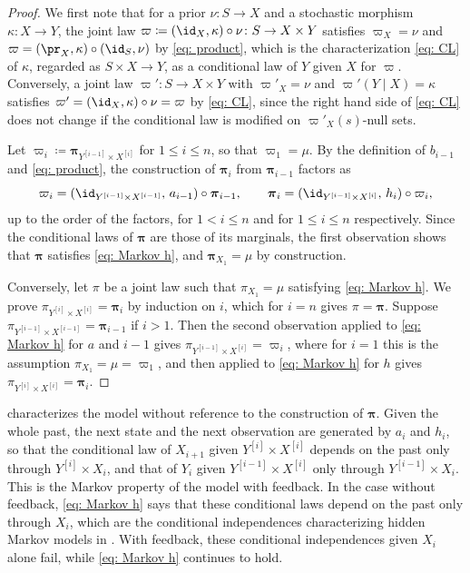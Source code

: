 \documentclass[12pt,reqno]{amsart}%
\theoremstyle{plain}
\theoremstyle{definition}
\def\bspi{\boldsymbol{\pi}}
\begin{document}
\begin{proof}
	We first note that for a prior $\nu\colon S\rightarrow X$ and a stochastic morphism $\kappa\colon X\rightarrow Y$,
	the joint law $\varpi\coloneqq(\id_X,\kappa)\circ\nu\colon S\rightarrow X\times Y$ satisfies $\varpi_X=\nu$ and
	$\varpi=(\pr_X,\kappa)\circ(\id_S,\nu)$ by \eqref{eq: product},
	which is the characterization \eqref{eq: CL} of $\kappa$, regarded as $S\times X\rightarrow Y$,
	as a conditional law of $Y$ given $X$ for $\varpi$.
	Conversely, a joint law $\varpi'\colon S\rightarrow X\times Y$ with $\varpi'_X=\nu$ and $\varpi'(Y\mid X)=\kappa$
	satisfies $\varpi'=(\id_X,\kappa)\circ\nu=\varpi$ by \eqref{eq: CL}, since the right hand side of \eqref{eq: CL}
	does not change if the conditional law is modified on $\varpi'_X(s)$-null sets.

	Let $\varpi_i\coloneqq\bspi_{Y^{[i-1]}\times X^{[i]}}$ for $1\leq i\leq n$, so that $\varpi_1=\mu$.
	By the definition of $b_{i-1}$ and \eqref{eq: product}, the construction of $\bspi_i$ from $\bspi_{i-1}$ factors as
	\[
		\varpi_i=(\id_{Y^{[i-1]}\times X^{[i-1]}},\,a_{i-1})\circ\bspi_{i-1},\qquad
		\bspi_i=(\id_{Y^{[i-1]}\times X^{[i]}},\,h_i)\circ\varpi_i,
	\]
	up to the order of the factors, for $1<i\leq n$ and for $1\leq i\leq n$ respectively.
	Since the conditional laws of $\bspi$ are those of its marginals, the first observation shows that
	$\bspi$ satisfies \eqref{eq: Markov h}, and $\bspi_{X_1}=\mu$ by construction.

	Conversely, let $\pi$ be a joint law such that $\pi_{X_1}=\mu$ satisfying \eqref{eq: Markov h}.
	We prove $\pi_{Y^{[i]}\times X^{[i]}}=\bspi_i$ by induction on $i$, which for $i=n$ gives $\pi=\bspi$.
	Suppose $\pi_{Y^{[i-1]}\times X^{[i-1]}}=\bspi_{i-1}$ if $i>1$.
	Then the second observation applied to \eqref{eq: Markov h} for $a$ and $i-1$ gives $\pi_{Y^{[i-1]}\times X^{[i]}}=\varpi_i$,
	where for $i=1$ this is the assumption $\pi_{X_1}=\mu=\varpi_1$,
	and then applied to \eqref{eq: Markov h} for $h$ gives $\pi_{Y^{[i]}\times X^{[i]}}=\bspi_i$.
\end{proof}

\begin{remark}
	 characterizes the model without reference to the construction of 
	$\bspi$.
	Given the whole past, the next state and the next observation are generated by $a_i$ and $h_i$, so that
	the conditional law of $X_{i+1}$ given $Y^{[i]}\times X^{[i]}$ depends on the past 
	only through $Y^{[i]}\times X_i$,
	and that of $Y_i$ given $Y^{[i-1]}\times X^{[i]}$ only through $Y^{[i-1]}\times X_i$.
	This is the Markov property of the model with feedback.
	In the case without feedback, \eqref{eq: Markov h} says that these conditional laws
	depend on the past only through $X_i$, which are the conditional independences characterizing
	hidden Markov models in \cite[Proposition~3.7]{F25}.
	With feedback, these conditional independences
	given $X_i$ alone fail, while \eqref{eq: Markov h} continues to hold.
\end{remark}
\end{document}
